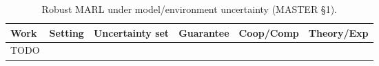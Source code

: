 \begin{table}[t]\centering\footnotesize
\caption{Robust MARL under model/environment uncertainty (MASTER \S1).}
\label{tab:model}
\begin{tabular}{llllll}
\toprule
Work & Setting & Uncertainty set & Guarantee & Coop/Comp & Theory/Exp \\
\midrule
TODO & & & & & \\
\bottomrule
\end{tabular}
\end{table}

